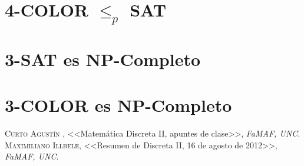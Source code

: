 \documentclass[12pt,a4paper]{report}
\begin{document}
	\section{4-COLOR $\leq_{\textit{p}}$ SAT}
	
	\section{3-SAT es NP-Completo}
	
	\section{3-COLOR es NP-Completo}
	
	
\begin{thebibliography}{X}
 \textsc{Curto Agustín },
<<Matemática Discreta II, apuntes de clase>>,
\textit{FaMAF, UNC}.
 \textsc{Maximiliano Illbele},
<<Resumen de Discreta II, 16 de agosto de 2012>>,
\textit{FaMAF, UNC}.
\end{thebibliography}
\end{document}
